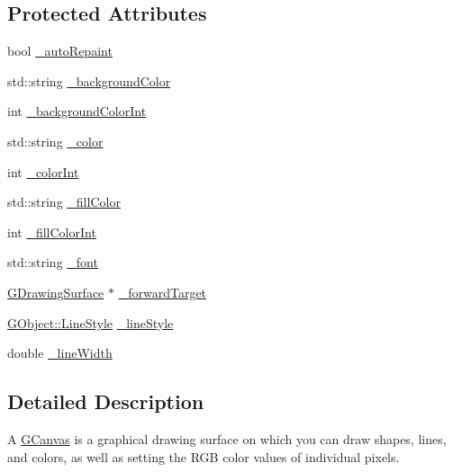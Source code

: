 \subsection*{Protected Attributes}
\begin{DoxyCompactItemize}
\item 
bool \mbox{\hyperlink{classsgl_1_1GDrawingSurface_a738dd6afc69ac536ad46cf4d89a90933}{\+\_\+auto\+Repaint}}
\item 
std\+::string \mbox{\hyperlink{classsgl_1_1GDrawingSurface_ad233544ea51cf6b435a199f3e3790607}{\+\_\+background\+Color}}
\item 
int \mbox{\hyperlink{classsgl_1_1GDrawingSurface_abb8452ab4f23ecf455b9e021bf09ef91}{\+\_\+background\+Color\+Int}}
\item 
std\+::string \mbox{\hyperlink{classsgl_1_1GDrawingSurface_a1134e770ae4315ea8bc1201e2f21da8b}{\+\_\+color}}
\item 
int \mbox{\hyperlink{classsgl_1_1GDrawingSurface_a003fdd343d9b7505c53a8b7a134200ed}{\+\_\+color\+Int}}
\item 
std\+::string \mbox{\hyperlink{classsgl_1_1GDrawingSurface_a179f8d6cee65cd8a54692e32b224392a}{\+\_\+fill\+Color}}
\item 
int \mbox{\hyperlink{classsgl_1_1GDrawingSurface_a751def333a67d651e5b99cc331ecb496}{\+\_\+fill\+Color\+Int}}
\item 
std\+::string \mbox{\hyperlink{classsgl_1_1GDrawingSurface_aea76ea1a8b5dd7b0a78653277e63b536}{\+\_\+font}}
\item 
\mbox{\hyperlink{classsgl_1_1GDrawingSurface}{G\+Drawing\+Surface}} $\ast$ \mbox{\hyperlink{classsgl_1_1GDrawingSurface_acbb02fa2a4a51a450fd1cc64dfc39ddd}{\+\_\+forward\+Target}}
\item 
\mbox{\hyperlink{classsgl_1_1GObject_a86e0f5648542856159bb40775c854aa7}{G\+Object\+::\+Line\+Style}} \mbox{\hyperlink{classsgl_1_1GDrawingSurface_ae15d02c66691247a6824dc5943a620e2}{\+\_\+line\+Style}}
\item 
double \mbox{\hyperlink{classsgl_1_1GDrawingSurface_a16e9033665937f13de2e163dc2184aff}{\+\_\+line\+Width}}
\end{DoxyCompactItemize}


\subsection{Detailed Description}
A \mbox{\hyperlink{classsgl_1_1GCanvas}{G\+Canvas}} is a graphical drawing surface on which you can draw shapes, lines, and colors, as well as setting the R\+GB color values of individual pixels. 

